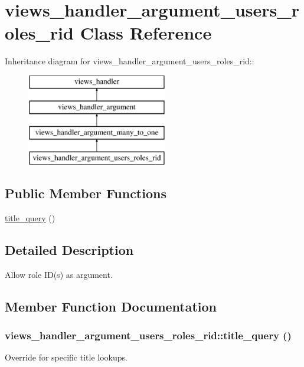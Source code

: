 \hypertarget{classviews__handler__argument__users__roles__rid}{
\section{views\_\-handler\_\-argument\_\-users\_\-roles\_\-rid Class Reference}
\label{classviews__handler__argument__users__roles__rid}
}
Inheritance diagram for views\_\-handler\_\-argument\_\-users\_\-roles\_\-rid::\begin{figure}[H]
\begin{center}
\leavevmode
\includegraphics[height=4cm]{classviews__handler__argument__users__roles__rid}
\end{center}
\end{figure}
\subsection*{Public Member Functions}
\begin{DoxyCompactItemize}
\item 
\hyperlink{classviews__handler__argument__users__roles__rid_a0cc229ef972f8a7d9184b45443271992}{title\_\-query} ()
\end{DoxyCompactItemize}


\subsection{Detailed Description}
Allow role ID(s) as argument. 

\subsection{Member Function Documentation}
\hypertarget{classviews__handler__argument__users__roles__rid_a0cc229ef972f8a7d9184b45443271992}{
\subsubsection[{title\_\-query}]{\setlength{\rightskip}{0pt plus 5cm}views\_\-handler\_\-argument\_\-users\_\-roles\_\-rid::title\_\-query ()}}
\label{classviews__handler__argument__users__roles__rid_a0cc229ef972f8a7d9184b45443271992}
Override for specific title lookups. 

